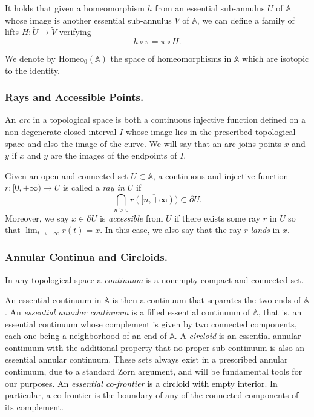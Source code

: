 \documentclass[12pt,a4paper]{amsart}
\theoremstyle{definition}
\theoremstyle{remark}
\newcommand{\homeo}{\mathrm{Homeo}_0(\A)}
\newcommand{\A}{\mathbb{A}}
\begin{document}
It holds that given a homeomorphism $h$ from an essential sub-annulus $U$ of $\A$ whose image is another essential sub-annulus $V$ of $\A$, we can define a family of lifts 
$H:\tilde{U}\to\tilde{V}$ verifying
$$h\circ\pi=\pi\circ H.$$

We denote by $\homeo$ the space of homeomorphisms in $\A$ which are
isotopic to the identity.

\subsubsection{Rays and Accessible Points.}

An \emph{arc} in a topological space is both a continuous injective function defined on a non-degenerate closed interval $I$ whose image lies in the prescribed topological space and also the image of the curve. We will say that an arc joins points $x$ and $y$ if $x$ and $y$ are the images of the endpoints of $I$.

Given an open and connected set $U\subset\A$, a continuous and injective function $r:[0,+\infty)\to U$ is called a \emph{ray in $U$} if \textcolor{black}{
$$\bigcap_{n>0} \overline{r([n,+\infty))}\subset \partial U.$$} Moreover, we say $x\in\partial U$ is \emph{accessible} from $U$ if there exists some ray $r$ in $U$ so that $\lim_{t\to+\infty}r(t)=x$. In this case, we also say that the ray $r$ \emph{lands} in $x$.

\subsubsection{Annular Continua and Circloids.}
In any topological space a \emph{continuum} is a nonempty compact and connected set.

An essential continuum in $\A$ is then a continuum that separates the two ends of $\A$. An \emph{essential annular continuum} is a filled essential continuum of $\A$, that is, an essential continuum whose complement is given by two connected components, each one being a neighborhood of an end of $\A$.  A \emph{circloid} is an essential annular continuum with the additional property that no proper sub-continuum is also an essential annular continuum. These sets always exist in a prescribed annular continuum, due to a standard Zorn argument, and will be fundamental tools for our purposes. \textcolor{black}{An \emph{essential co-frontier} is  a circloid with empty interior}. In particular, a co-frontier is the boundary of any of the connected components of its complement.
\end{document}
